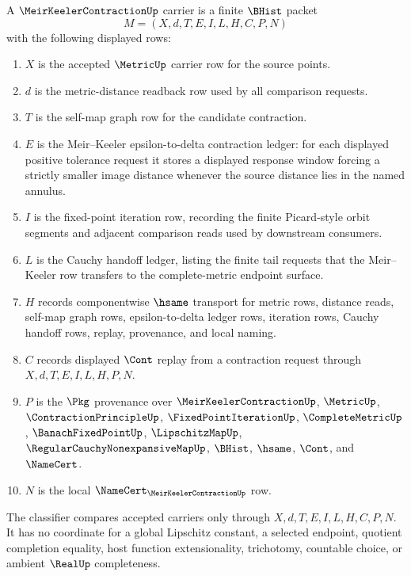\begin{definition}
\label{def:meir-keeler-contraction-carrier}
A $\MeirKeelerContractionUp$ carrier is a finite $\BHist$ packet
$$
M=(X,d,T,E,I,L,H,C,P,N)
$$
with the following displayed rows:
\begin{enumerate}
\item $X$ is the accepted $\MetricUp$ carrier row for the source points.
\item $d$ is the metric-distance readback row used by all comparison requests.
\item $T$ is the self-map graph row for the candidate contraction.
\item $E$ is the Meir--Keeler epsilon-to-delta contraction ledger: for each displayed positive tolerance request it stores a displayed response window forcing a strictly smaller image distance whenever the source distance lies in the named annulus.
\item $I$ is the fixed-point iteration row, recording the finite Picard-style orbit segments and adjacent comparison reads used by downstream consumers.
\item $L$ is the Cauchy handoff ledger, listing the finite tail requests that the Meir--Keeler row transfers to the complete-metric endpoint surface.
\item $H$ records componentwise $\hsame$ transport for metric rows, distance reads, self-map graph rows, epsilon-to-delta ledger rows, iteration rows, Cauchy handoff rows, replay, provenance, and local naming.
\item $C$ records displayed $\Cont$ replay from a contraction request through $X,d,T,E,I,L,H,P,N$.
\item $P$ is the $\Pkg$ provenance over $\MeirKeelerContractionUp$, $\MetricUp$, $\ContractionPrincipleUp$, $\FixedPointIterationUp$, $\CompleteMetricUp$, $\BanachFixedPointUp$, $\LipschitzMapUp$, $\RegularCauchyNonexpansiveMapUp$, $\BHist$, $\hsame$, $\Cont$, and $\NameCert$.
\item $N$ is the local $\NameCert_{\MeirKeelerContractionUp}$ row.
\end{enumerate}
The classifier compares accepted carriers only through $X,d,T,E,I,L,H,C,P,N$. It has no coordinate for a global Lipschitz constant, a selected endpoint, quotient completion equality, host function extensionality, trichotomy, countable choice, or ambient $\RealUp$ completeness.
\end{definition}

